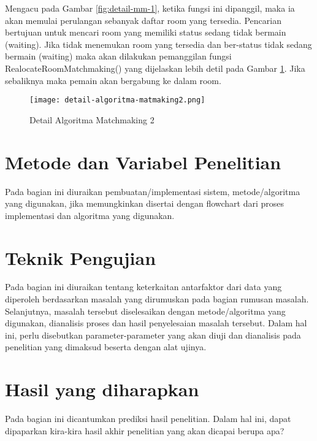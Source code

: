         Mengacu pada Gambar \ref{fig:detail-mm-1}, ketika fungsi ini dipanggil, 
maka ia akan memulai perulangan sebanyak daftar room yang 
tersedia. Pencarian bertujuan untuk mencari room yang memiliki 
status sedang tidak bermain (waiting). Jika tidak menemukan 
room yang tersedia dan ber-status tidak sedang bermain (waiting) 
maka akan dilakukan pemanggilan fungsi 
RealocateRoomMatchmaking() yang dijelaskan lebih detil pada 
Gambar \ref{fig:detail-mm-2}. Jika sebaliknya maka pemain akan bergabung ke 
dalam room.

\begin{figure}[h]
    \centering
    \caption{Detail Algoritma Matchmaking 2}
    \texttt{[image: detail-algoritma-matmaking2.png]}
    \label{fig:detail-mm-2}
    \end{figure}


        \section{Metode dan Variabel Penelitian}
        Pada bagian ini diuraikan pembuatan/implementasi sistem,   metode/algoritma yang digunakan, jika memungkinkan disertai dengan flowchart dari proses implementasi dan algoritma yang digunakan.
        
        \section{Teknik Pengujian}
        Pada bagian ini diuraikan tentang keterkaitan antarfaktor dari data yang diperoleh  berdasarkan masalah yang dirumuskan pada bagian rumusan masalah. Selanjutnya,  masalah tersebut diselesaikan dengan metode/algoritma yang digunakan, dianalisis proses dan hasil penyelesaian masalah tersebut.  Dalam hal ini, perlu disebutkan parameter-parameter yang akan diuji dan dianalisis pada penelitian yang dimaksud beserta dengan alat ujinya.
        
        \section{Hasil yang diharapkan}
        Pada bagian ini dicantumkan prediksi hasil penelitian. Dalam hal ini, dapat dipaparkan kira-kira hasil akhir penelitian yang akan dicapai berupa apa?